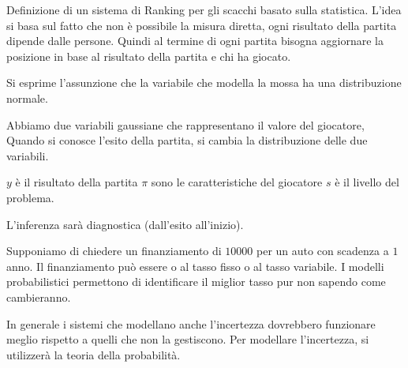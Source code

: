 \begin{esempio}
    Definizione di un sistema di Ranking per gli scacchi basato sulla statistica.
    L'idea si basa sul fatto che non è possibile la misura diretta, ogni risultato
    della partita dipende dalle persone. Quindi al termine di ogni partita bisogna 
    aggiornare la posizione in base al risultato della partita e chi ha giocato.

    Si esprime l'assunzione che la variabile che modella la mossa ha una distribuzione
    normale.

    Abbiamo due variabili gaussiane che rappresentano il valore del giocatore, Quando
    si conosce l'esito della partita, si cambia la distribuzione delle due variabili.

    $y$ è il risultato della partita
    $\pi$ sono le caratteristiche del giocatore
    $s$ è il livello del problema.

    L'inferenza sarà diagnostica (dall'esito all'inizio).
\end{esempio}

\begin{esempio}
    Supponiamo di chiedere un finanziamento di $10000$ per un auto con scadenza
    a $1$ anno. Il finanziamento può essere o al tasso fisso o al tasso variabile.
    I modelli probabilistici permettono di identificare il miglior tasso pur non
    sapendo come cambieranno.
\end{esempio}

In generale i sistemi che modellano anche l'incertezza dovrebbero funzionare meglio
rispetto a quelli che non la gestiscono. Per modellare l'incertezza, si utilizzerà
la teoria della probabilità.
